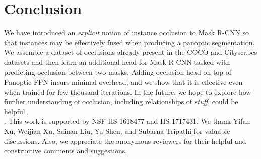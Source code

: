 \documentclass[10pt,twocolumn,letterpaper]{article}
\begin{document}
\begin{table}[!htp]
\centering

\vspace{-2mm}
\caption{\textbf{Ablation study on different types of occlusion on the Cityscapes \textit{val} dataset.} \checkmark means capability enabled.}
\label{table:type_occlusion_ablation}
\vspace{0mm}
\end{table}

\vspace{-5mm}

\section{Conclusion}
We have introduced an \textit{explicit} notion of instance occlusion to Mask R-CNN so that instances may be effectively fused when producing a panoptic segmentation. We assemble a dataset of occlusions already present in the COCO and Cityscapes datasets and then learn an additional head for Mask R-CNN tasked with predicting occlusion between two masks. Adding occlusion head on top of Panoptic FPN incurs minimal overhead, and we show that it is effective even when trained for few thousand iterations. In the future, we hope to explore how further understanding of occlusion, including relationships of \textit{stuff}, could be helpful.\\

.
This work is supported by NSF IIS-1618477 and IIS-1717431. We thank Yifan Xu, Weijian Xu, Sainan Liu, Yu Shen, and Subarna Tripathi for valuable discussions. Also, we appreciate the anonymous reviewers for their helpful and constructive comments and suggestions.

{\small


}
\end{document}
